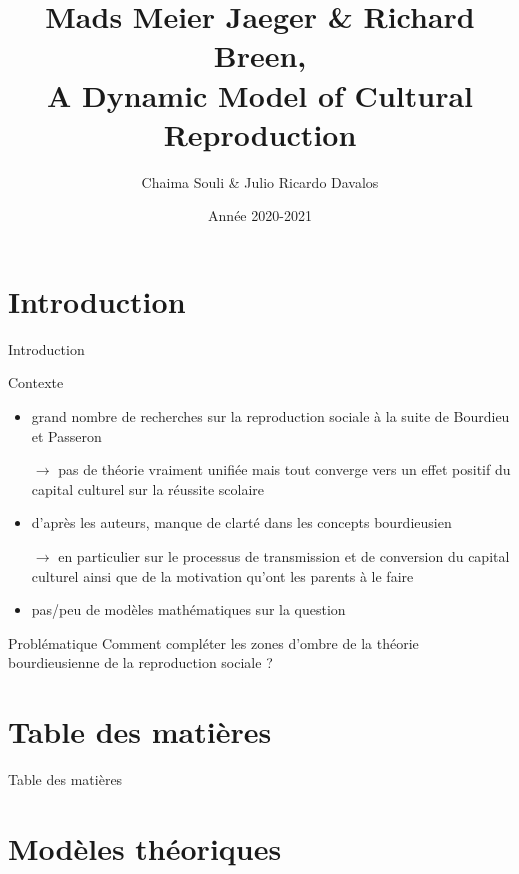 \documentclass[9pt]{beamer}
\title{\textbf{Mads Meier Jaeger \&  Richard Breen,\\ \og A Dynamic Model of Cultural Reproduction \fg{}}}
\author{Chaima Souli \& Julio Ricardo Davalos}
\institute{Master Quantifier en Sciences Sociales -- ENS/EHESS}
\date{Année 2020-2021}
\begin{document}
	\begin{frame}
    \titlepage
	\end{frame}
	
\section*{Introduction}
\begin{frame}{Introduction}
    \begin{block}{Contexte}
        \begin{itemize}
            \item grand nombre de recherches sur la reproduction sociale à la suite de Bourdieu et Passeron
            \item[$\to$] pas de théorie vraiment unifiée mais tout converge vers un effet positif du capital culturel sur la réussite scolaire
            \item d'après les auteurs, manque de clarté dans les concepts bourdieusien
            \item[$\to$] en particulier sur le processus de transmission et de conversion du capital culturel ainsi que de la motivation qu'ont les parents à le faire
            \item pas/peu de modèles mathématiques sur la question
        \end{itemize}
    \end{block}
    \begin{alertblock}{Problématique}
	Comment compléter les zones d'ombre de la théorie bourdieusienne de la reproduction sociale ?
    \end{alertblock}
\end{frame}

\section*{Table des matières}
\begin{frame}{Table des matières}
	\tableofcontents[hideallsubsections]%
\end{frame}

\section{Modèles théoriques}
\end{document}
